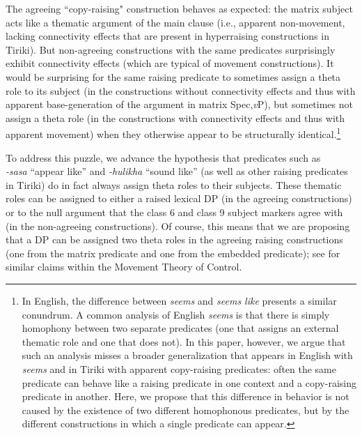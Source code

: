 \documentclass[output=paper,colorlinks,citecolor=brown
]{langscibook}
\begin{document}
The agreeing ``copy-raising" construction behaves as expected: the matrix subject acts like a thematic argument of the main clause (i.e., apparent non-movement, lacking connectivity effects that are present in hyperraising constructions in Tiriki). But non-agreeing constructions with the same predicates surprisingly exhibit connectivity effects (which are typical of movement constructions). It would be surprising for the same raising predicate to sometimes assign a theta role to its subject (in the constructions without connectivity effects and thus with apparent base-generation of the argument in matrix Spec,\textit{v}P), but sometimes not assign a theta role (in the constructions with connectivity effects and thus with apparent movement) when they otherwise appear to be structurally identical.\footnote{In English, the difference between \textit{seems} and \textit{seems like} presents a similar conundrum. A common analysis of English \textit{seems} is that there is simply homophony between two separate predicates (one that assigns an external thematic role and one that does not). In this paper, however, we argue that such an analysis misses a broader generalization that appears in English with \textit{seems} and in Tiriki with apparent copy-raising predicates: often the same predicate can behave like a raising predicate in one context and a copy-raising predicate in another. Here, we propose that this difference in behavior is not caused by the existence of two different homophonous predicates, but by the different constructions in which a single predicate can appear.
}

To address this puzzle, we advance the hypothesis that predicates such as \\
\textit{-sasa} ``appear like'' and \textit{-hulikha} ``sound like'' (as well as other raising predicates in Tiriki) do in fact always assign theta roles to their subjects. These thematic roles can be assigned to either a raised lexical DP (in the agreeing constructions) or to the null argument that the class 6 and class 9 subject markers agree with (in the non-agreeing constructions). Of course, this means that we are proposing that a DP can be assigned two theta roles in the agreeing raising constructions (one from the matrix predicate and one from the embedded predicate); see \citet{BoeckxHornsteinNunes:2010} for similar claims within the Movement Theory of Control.
\end{document}
